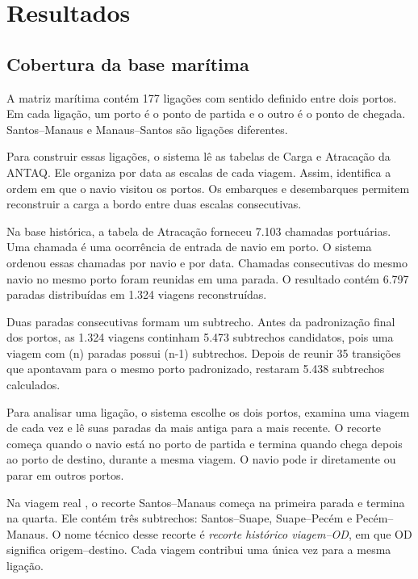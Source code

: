 \chapter{Resultados}
\label{ch:resultados}

\section{Cobertura da base marítima}
\label{sec:inventario-resultados}

A matriz marítima contém 177 ligações com sentido definido entre dois portos. Em cada ligação, um porto é o ponto de partida e o outro é o ponto de chegada. Santos--Manaus e Manaus--Santos são ligações diferentes.

Para construir essas ligações, o sistema lê as tabelas de Carga e Atracação da ANTAQ. Ele organiza por data as escalas de cada viagem. Assim, identifica a ordem em que o navio visitou os portos. Os embarques e desembarques permitem reconstruir a carga a bordo entre duas escalas consecutivas.

Na base histórica, a tabela de Atracação forneceu 7.103 chamadas portuárias. Uma chamada é uma ocorrência de entrada de navio em porto. O sistema ordenou essas chamadas por navio e por data. Chamadas consecutivas do mesmo navio no mesmo porto foram reunidas em uma parada. O resultado contém 6.797 paradas distribuídas em 1.324 viagens reconstruídas.

Duas paradas consecutivas formam um subtrecho. Antes da padronização final dos portos, as 1.324 viagens continham 5.473 subtrechos candidatos, pois uma viagem com (n) paradas possui (n-1) subtrechos. Depois de reunir 35 transições que apontavam para o mesmo porto padronizado, restaram 5.438 subtrechos calculados.

Para analisar uma ligação, o sistema escolhe os dois portos, examina uma viagem de cada vez e lê suas paradas da mais antiga para a mais recente. O recorte começa quando o navio está no porto de partida e termina quando chega depois ao porto de destino, durante a mesma viagem. O navio pode ir diretamente ou parar em outros portos.

Na viagem real , o recorte Santos--Manaus começa na primeira parada e termina na quarta. Ele contém três subtrechos: Santos--Suape, Suape--Pecém e Pecém--Manaus. O nome técnico desse recorte é \emph{recorte histórico viagem--OD}, em que OD significa origem--destino. Cada viagem contribui uma única vez para a mesma ligação.

